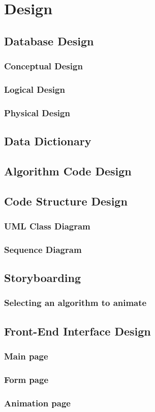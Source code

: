 \chapter{Design}


\section{Database Design}
\subsection{Conceptual Design}
\subsection{Logical Design}
\subsection{Physical Design}

\section{Data Dictionary}

\section{Algorithm Code Design}

\section{Code Structure Design}
\subsection{UML Class Diagram}
\subsection{Sequence Diagram}

\section{Storyboarding}
\subsection{Selecting an algorithm to animate}

\section{Front-End Interface Design}
\subsection{Main page}
\subsection{Form page}
\subsection{Animation page}



